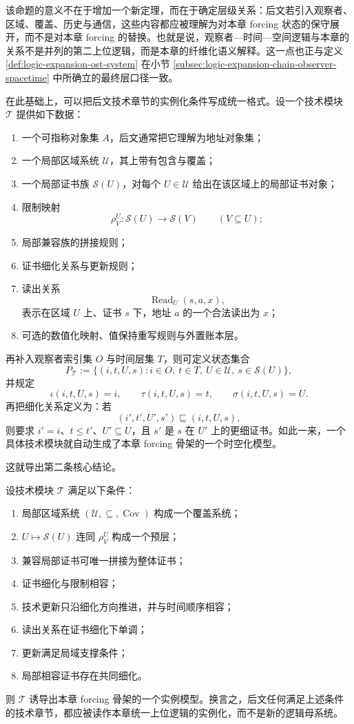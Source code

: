 该命题的意义不在于增加一个新定理，而在于确定层级关系：后文若引入观察者、区域、覆盖、历史与通信，这些内容都应被理解为对本章 forcing 状态的保守展开，而不是对本章 forcing 的替换。也就是说，观察者—时间—空间逻辑与本章的关系不是并列的第二上位逻辑，而是本章的纤维化语义解释。这一点也正与定义 \ref{def:logic-expansion-ost-system} 在小节 \ref{subsec:logic-expansion-chain-observer-spacetime} 中所确立的最终层口径一致。

在此基础上，可以把后文技术章节的实例化条件写成统一格式。设一个技术模块 \(\mathcal T\) 提供如下数据：
\begin{enumerate}
  \item 一个可指称对象集 \(A\)，后文通常把它理解为地址对象集；
  \item 一个局部区域系统 \(\mathcal U\)，其上带有包含与覆盖；
  \item 一个局部证书族 \(\mathcal S(U)\)，对每个 \(U\in\mathcal U\) 给出在该区域上的局部证书对象；
  \item 限制映射
  \[
  \rho_V^U:\mathcal S(U)\to \mathcal S(V)
  \qquad (V\subseteq U);
  \]
  \item 局部兼容族的拼接规则；
  \item 证书细化关系与更新规则；
  \item 读出关系
  \[
  \operatorname{Read}_U(s,a,x),
  \]
  表示在区域 \(U\) 上、证书 \(s\) 下，地址 \(a\) 的一个合法读出为 \(x\)；
  \item 可选的数值化映射、值保持重写规则与外置账本层。
\end{enumerate}
再补入观察者索引集 \(O\) 与时间层集 \(T\)，则可定义状态集合
\[
P_{\mathcal T}
:=
\{(i,t,U,s): i\in O,\ t\in T,\ U\in \mathcal U,\ s\in \mathcal S(U)\},
\]
并规定
\[
\iota(i,t,U,s)=i,\qquad
\tau(i,t,U,s)=t,\qquad
\sigma(i,t,U,s)=U.
\]
再把细化关系定义为：若
\[
(i',t',U',s')\sqsubseteq(i,t,U,s),
\]
则要求 \(i'=i\)、\(t\le t'\)、\(U'\subseteq U\)，且 \(s'\) 是 \(s\) 在 \(U'\) 上的更细证书。如此一来，一个具体技术模块就自动生成了本章 forcing 骨架的一个时空化模型。

这就导出第二条核心结论。

\begin{proposition}[技术实例化接口]\label{prop:logic-expansion-technical-module-instantiation}
设技术模块 \(\mathcal T\) 满足以下条件：
\begin{enumerate}
  \item 局部区域系统 \((\mathcal U,\subseteq,\operatorname{Cov})\) 构成一个覆盖系统；
  \item \(U\mapsto \mathcal S(U)\) 连同 \(\rho^U_V\) 构成一个预层；
  \item 兼容局部证书可唯一拼接为整体证书；
  \item 证书细化与限制相容；
  \item 技术更新只沿细化方向推进，并与时间顺序相容；
  \item 读出关系在证书细化下单调；
  \item 更新满足局域支撑条件；
  \item 局部相容证书存在共同细化。
\end{enumerate}
则 \(\mathcal T\) 诱导出本章 forcing 骨架的一个实例模型。换言之，后文任何满足上述条件的技术章节，都应被读作本章统一上位逻辑的实例化，而不是新的逻辑母系统。
\end{proposition}


